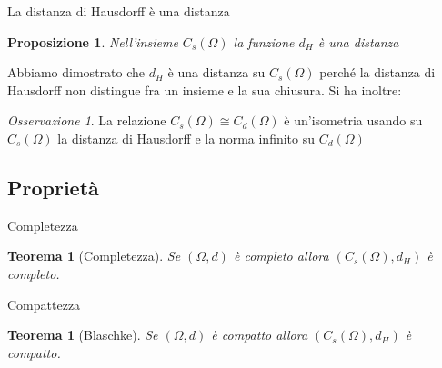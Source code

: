 \documentclass{beamer}
\newcounter{counter1}
\theoremstyle{plain}
\newtheorem{myteo}[counter1]{Teorema}
\newtheorem{mypro}[counter1]{Proposizione}
\theoremstyle{definition}
\theoremstyle{remark}
\newtheorem{myoss}[counter1]{Osservazione}
\newcommand{\obar}[1]{\overline{#1}}
\newcommand{\set}[1]{\left\{#1\right\}}
\newcommand{\pa}[1]{\left(#1\right)}
\newcommand{\abs}[1]{\left|#1\right|}
\newcommand{\norm}[1]{\left\|#1\right\|}
\begin{document}
\begin{frame}{La distanza di Hausdorff è una distanza}
  \begin{mypro}
    Nell'insieme $C_s(\Omega)$ la funzione $d_H$ è una distanza
  \end{mypro}

    

  \vfill
  Abbiamo dimostrato che $d_H$ è una distanza su $C_s(\Omega)$ perché
  la distanza di Hausdorff non distingue fra un insieme e la sua
  chiusura.
  \vfill
  Si ha inoltre:
  \begin{myoss}
    La relazione $C_s(\Omega) \cong C_d(\Omega)$ è un'isometria usando
    su $C_s(\Omega)$ la distanza di Hausdorff e la norma infinito su
    $C_d(\Omega)$
  \end{myoss}
\end{frame}

\subsection{Proprietà}

\begin{frame}{Completezza}
  \begin{myteo}[Completezza]%
    Se $(\Omega,d)$ è completo allora $\pa{C_s(\Omega),d_H}$ è completo.
  \end{myteo}
\end{frame}

\begin{frame}{Compattezza}
  \begin{myteo}[Blaschke]%
    Se $(\Omega,d)$ è compatto allora $\pa{C_s(\Omega),d_H}$ è compatto.
  \end{myteo}
    
\end{frame}
\end{document}
